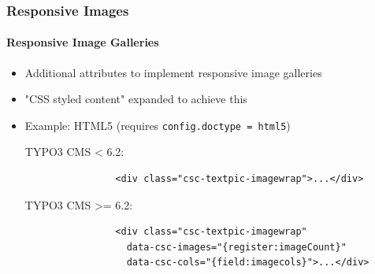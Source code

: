 \begin{frame}[fragile]
	\frametitle{Responsive Images}
	\framesubtitle{Responsive Image Galleries}

	\begin{itemize}
		\item Additional attributes to implement responsive image galleries
		\item "CSS styled content" expanded to achieve this
		\item Example: HTML5 (requires \texttt{config.doctype = html5})\newline

			TYPO3 CMS < 6.2:


			\begin{lstlisting}
				<div class="csc-textpic-imagewrap">...</div>
			\end{lstlisting}

			TYPO3 CMS >= 6.2:

			\begin{lstlisting}
				<div class="csc-textpic-imagewrap"
				  data-csc-images="{register:imageCount}"
				  data-csc-cols="{field:imagecols}">...</div>
			\end{lstlisting}

	\end{itemize}

\end{frame}


